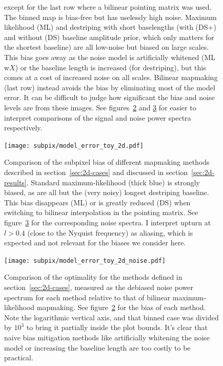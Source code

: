 \documentclass[twocolumn,apj]{aastex63}
\begin{document}
\begin{figure}[p]
{		except for the last row where a bilinear pointing matrix was used.
		The binned map is bias-free but has uselessly high noise. Maximum likelihood (ML)
		and destriping with short baselengths (with (DS+) and without (DS) baseline amplitude prior,
		which only matters for the shortest baseline)
		are all low-noise but biased on large scales. This bias goes away as the noise model
		is artificially whitened (ML w$X$) or the baseline length is increased (for destriping),
		but this comes at a cost of increased noise on all scales.
		Bilinear mapmaking (last row) instead avoids the bias by eliminating most of the model error.
		It can be difficult to judge how significant the bias and noise levels are from
		these images. See figures~\ref{fig:2d-bias} and \ref{fig:2d-noise} for easier to
		interpret comparisons of the signal and noise power spectra respectively.
	}
	\label{fig:2d-maps}
\end{figure}

\begin{figure}
	\centering
	\hspace*{-5mm}\texttt{[image: subpix/model\_error\_toy\_2d.pdf]}
	\caption{
		Comparison of the subpixel bias of different mapmaking methods
		described in section~\ref{sec:2d-cases} and discussed in section~\ref{sec:2d-results}.
		Standard maximum-likelihood (thick blue) is strongly biased, as are all but
		the (very noisy) longest destriping baseline. This bias disappears (ML)
		or is greatly reduced (DS) when switching to bilinear interpolation in the pointing matrix.
		See figure~\ref{fig:2d-noise} for the corresponding noise spectra.
		I interpret upturn at $l>0.4$ (close to the Nyquist frequency) as aliasing, which
		is expected and not relevant for the biases we consider here.
	}
	\label{fig:2d-bias}
\end{figure}

\begin{figure}[h!]
	\centering
	\hspace*{-5mm}\texttt{[image: subpix/model\_error\_toy\_2d\_noise.pdf]}
	\caption{
		Comparison of the optimality for the methods defined in section~\ref{sec:2d-cases}, measured
		as the debiased noise power spectrum for each method relative
		to that of bilinear maximum-likelihood mapmaking. See figure~\ref{fig:2d-bias}
		for the bias of each method.
		Note the logarithmic vertical axis, and that binned case was divided by $10^3$
		to bring it partially inside the plot bounds.
		It's clear that naive bias mitigation
		methods like artificially whitening the noise model or increasing the
		baseline length are too costly to be practical.
	}
	\label{fig:2d-noise}
\end{figure}
\end{document}
